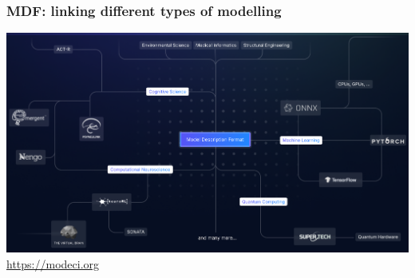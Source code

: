\begin{frame}[c]
  \frametitle{MDF: linking different types of modelling}
  \begin{center}
    \includegraphics[keepaspectratio,width=\textwidth]{./99_images/mdf}\vspace{1ex}
    \url{https://modeci.org}
  \end{center}
\end{frame}

